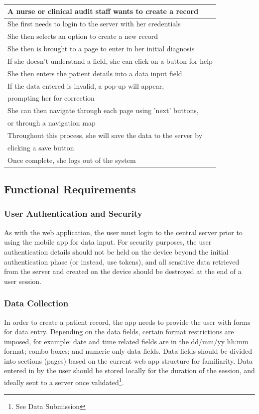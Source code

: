 \documentclass[12pt,a4paper,oneside,titlepage]{article}
\begin{document}
\begin{center}
\begin{tabular}{|l|}
	\hline
	A nurse or clinical audit staff wants to create a record\\ \hline
	She first needs to login to the server with her credentials\\ \hline
	She then selects an option to create a new record\\ \hline
	She then is brought to a page to enter in her initial diagnosis\\ \hline
	If she doesn't understand a field, she can click on a button for help\\ \hline
	She then enters the patient details into a data input field\\ \hline
	If the data entered is invalid, a pop-up will appear, \\prompting her for correction\\ \hline
	She can then navigate through each page using 'next' buttons, \\or through a navigation map\\ \hline
	Throughout this process, she will save the data to the server by \\clicking a save button\\ \hline
	Once complete, she logs out of the system\\ \hline
	\end{tabular}
\end{center}
\subsection{Functional Requirements}
\subsubsection{User Authentication and Security}
As with the web application, the user must login to the central server prior to using the mobile app for data input. For security purposes, the user authentication details should not be held on the device beyond the initial authentication phase (or instead, use tokens), and all sensitive data retrieved from the server and created on the device should be destroyed at the end of a user session.
\subsubsection{Data Collection}
In order to create a patient record, the app needs to provide the user with forms for data entry. Depending on the data fields, certain format restrictions are imposed, for example: date and time related fields are in the dd/mm/yy hh:mm format; combo boxes; and numeric only data fields. Data fields should be divided into sections (pages) based on the current web app structure for familiarity. Data entered in by the user should be stored locally for the duration of the session, and ideally sent to a server once validated\footnote{See Data Submission}.
\end{document}
